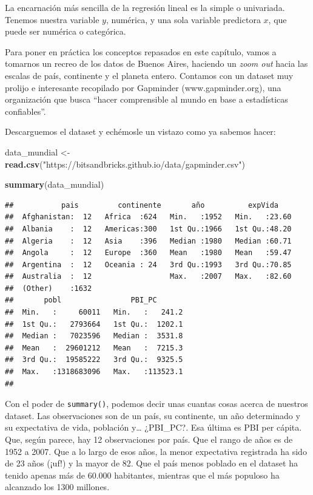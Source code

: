 \documentclass[]{book}
\newenvironment{Shaded}{\begin{snugshade}}{\end{snugshade}}
\newcommand{\KeywordTok}[1]{\textcolor[rgb]{0.13,0.29,0.53}{\textbf{#1}}}
\newcommand{\StringTok}[1]{\textcolor[rgb]{0.31,0.60,0.02}{#1}}
\newcommand{\NormalTok}[1]{#1}
\begin{document}
La encarnación más sencilla de la regresión lineal es la simple o
univariada. Tenemos nuestra variable \(y\), numérica, y una sola
variable predictora \(x\), que puede ser numérica o categórica.

Para poner en práctica los conceptos repasados en este capítulo, vamos a
tomarnos un recreo de los datos de Buenos Aires, haciendo un \emph{zoom
out} hacia las escalas de país, continente y el planeta entero. Contamos
con un dataset muy prolijo e interesante recopilado por Gapminder
(www.gapminder.org), una organización que busca ``hacer comprensible al
mundo en base a estadísticas confiables''.

Descarguemos el dataset y echémosle un vistazo como ya sabemos hacer:

\begin{Shaded}
\begin{Highlighting}[]
\NormalTok{data_mundial <-}\StringTok{ }\KeywordTok{read.csv}\NormalTok{(}\StringTok{"https://bitsandbricks.github.io/data/gapminder.csv"}\NormalTok{)}

\KeywordTok{summary}\NormalTok{(data_mundial)}
\end{Highlighting}
\end{Shaded}

\begin{verbatim}
##           pais         continente       año          expVida     
##  Afghanistan:  12   Africa  :624   Min.   :1952   Min.   :23.60  
##  Albania    :  12   Americas:300   1st Qu.:1966   1st Qu.:48.20  
##  Algeria    :  12   Asia    :396   Median :1980   Median :60.71  
##  Angola     :  12   Europe  :360   Mean   :1980   Mean   :59.47  
##  Argentina  :  12   Oceania : 24   3rd Qu.:1993   3rd Qu.:70.85  
##  Australia  :  12                  Max.   :2007   Max.   :82.60  
##  (Other)    :1632                                                
##       pobl                PBI_PC        
##  Min.   :     60011   Min.   :   241.2  
##  1st Qu.:   2793664   1st Qu.:  1202.1  
##  Median :   7023596   Median :  3531.8  
##  Mean   :  29601212   Mean   :  7215.3  
##  3rd Qu.:  19585222   3rd Qu.:  9325.5  
##  Max.   :1318683096   Max.   :113523.1  
## 
\end{verbatim}

Con el poder de \texttt{summary()}, podemos decir unas cuantas cosas
acerca de nuestros dataset. Las observaciones son de un país, su
continente, un año determinado y su expectativa de vida, población
y\ldots{} ¿PBI\_PC?. Esa última es PBI per cápita. Que, según parece,
hay 12 observaciones por país. Que el rango de años es de 1952 a 2007.
Que a lo largo de esos años, la menor expectativa registrada ha sido de
23 años (¡uf!) y la mayor de 82. Que el país menos poblado en el dataset
ha tenido apenas más de 60.000 habitantes, mientras que el más populoso
ha alcanzado los 1300 millones.
\end{document}
